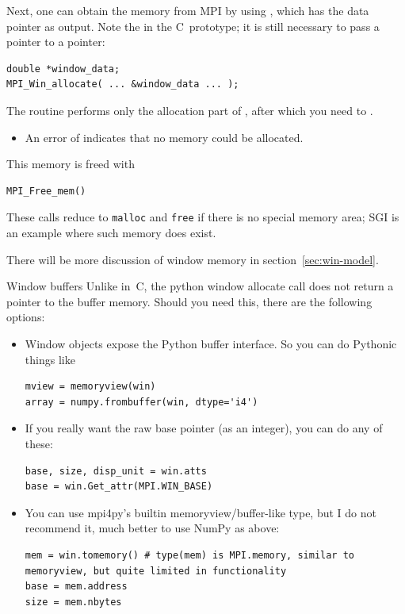 Next, one can obtain the memory from MPI by using
,
which has the data pointer as output. Note the  in the
C~prototype; it is still necessary to pass a pointer to a pointer:
\begin{lstlisting}
double *window_data;
MPI_Win_allocate( ... &window_data ... );
\end{lstlisting}
The routine  performs only the allocation
part of , after which you need to
.
\begin{itemize}
\item
  An error of  indicates that
  no memory could be allocated.
\end{itemize}

This memory is freed with
\begin{lstlisting}
MPI_Free_mem()
\end{lstlisting}
These calls reduce to \lstinline{malloc} and \lstinline{free} if there is no special
memory area; SGI is an example where such memory does exist.

There will be more discussion of window memory in section~\ref{sec:win-model}.

\begin{pythonnote}{Window buffers}
  Unlike in~C, the python window allocate call does not return a pointer
  to the buffer memory. Should you need this, there are the following options:
  \begin{itemize}
  \item  Window objects expose the Python buffer interface. So you can do Pythonic things like
\begin{lstlisting}
mview = memoryview(win)
array = numpy.frombuffer(win, dtype='i4')
\end{lstlisting}
\item 
  If you really want the raw base pointer (as an integer), you can do any of these:
\begin{lstlisting}
base, size, disp_unit = win.atts
base = win.Get_attr(MPI.WIN_BASE)
\end{lstlisting}
\item You can use mpi4py's builtin memoryview/buffer-like type, but I
  do not recommend it, much better to use NumPy as above:
\begin{lstlisting}
mem = win.tomemory() # type(mem) is MPI.memory, similar to memoryview, but quite limited in functionality
base = mem.address
size = mem.nbytes
\end{lstlisting}
  \end{itemize}
\end{pythonnote}

